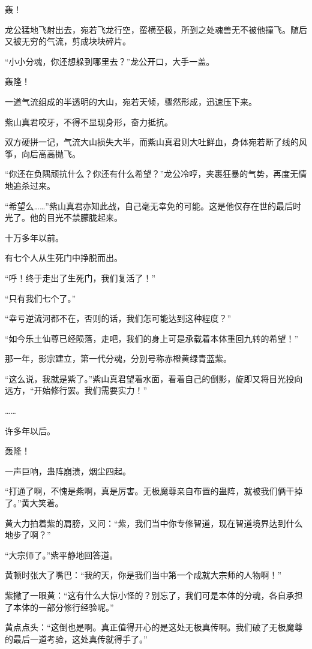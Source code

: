 \begin{this_body}
轰！

龙公猛地飞射出去，宛若飞龙行空，蛮横至极，所到之处魂兽无不被他撞飞。随后又被无穷的气流，剪成块块碎片。

“小小分魂，你还想躲到哪里去？”龙公开口，大手一盖。

轰隆！

一道气流组成的半透明的大山，宛若天倾，骤然形成，迅速压下来。

紫山真君咬牙，不得不显现身形，奋力抵抗。

双方硬拼一记，气流大山损失大半，而紫山真君则大吐鲜血，身体宛若断了线的风筝，向后高高抛飞。

“你还在负隅顽抗什么？你还有什么希望？”龙公冷哼，夹裹狂暴的气势，再度无情地追杀过来。

“希望么……”紫山真君亦知此战，自己毫无幸免的可能。这是他仅存在世的最后时光了。他的目光不禁朦胧起来。

十万多年以前。

有七个人从生死门中挣脱而出。

“呼！终于走出了生死门，我们复活了！”

“只有我们七个了。”

“幸亏逆流河都不在，否则的话，我们怎可能达到这种程度？”

“如今乐土仙尊已经陨落，走吧，我们的身上可是承载着本体重回九转的希望！”

那一年，影宗建立，第一代分魂，分别号称赤橙黄绿青蓝紫。

“这么说，我就是紫了。”紫山真君望着水面，看着自己的倒影，旋即又将目光投向远方，“开始修行罢。我们需要实力！”

……

许多年以后。

轰隆！

一声巨响，蛊阵崩溃，烟尘四起。

“打通了啊，不愧是紫啊，真是厉害。无极魔尊亲自布置的蛊阵，就被我们俩干掉了。”黄大笑着。

黄大力拍着紫的肩膀，又问：“紫，我们当中你专修智道，现在智道境界达到什么地步了啊？”

“大宗师了。”紫平静地回答道。

黄顿时张大了嘴巴：“我的天，你是我们当中第一个成就大宗师的人物啊！”

紫撇了一眼黄：“这有什么大惊小怪的？别忘了，我们可是本体的分魂，各自承担了本体的一部分修行经验呢。”

黄点点头：“这倒也是啊。真正值得开心的是这处无极真传啊。我们破了无极魔尊的最后一道考验，这处真传就得手了。”


\end{this_body}
